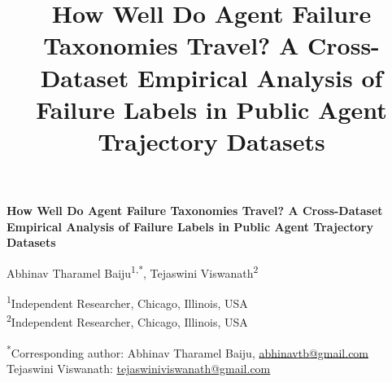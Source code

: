 \documentclass[12pt,letterpaper]{article}
\title{How Well Do Agent Failure Taxonomies Travel? A Cross-Dataset Empirical Analysis of Failure Labels in Public Agent Trajectory Datasets}
\author{}
\date{}
\begin{document}
\begin{center}
{\Large\bfseries How Well Do Agent Failure Taxonomies Travel? A Cross-Dataset Empirical Analysis of Failure Labels in Public Agent Trajectory Datasets\par}
\vspace{1.5em}

{\large Abhinav Tharamel Baiju\textsuperscript{1,*}, Tejaswini Viswanath\textsuperscript{2}\par}
\vspace{1em}

\textsuperscript{1}Independent Researcher, Chicago, Illinois, USA\\
\textsuperscript{2}Independent Researcher, Chicago, Illinois, USA\\
\vspace{1em}

\textsuperscript{*}Corresponding author: Abhinav Tharamel Baiju, \href{mailto:abhinavtb@gmail.com}{abhinavtb@gmail.com}\\
Tejaswini Viswanath: \href{mailto:tejaswiniviswanath@gmail.com}{tejaswiniviswanath@gmail.com}
\end{center}


\linenumbers
\end{document}
